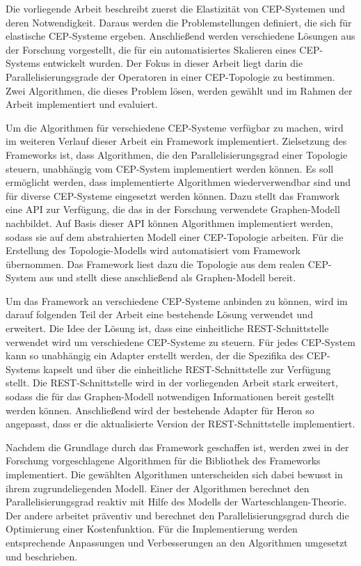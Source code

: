 Die vorliegende Arbeit beschreibt zuerst die Elastizität von CEP-Systemen und deren Notwendigkeit.
Daraus werden die Problemstellungen definiert, die sich für elastische CEP-Systeme ergeben.
Anschließend werden verschiedene Lösungen aus der Forschung vorgestellt, die für ein automatisiertes Skalieren eines CEP-Systems entwickelt wurden.
Der Fokus in dieser Arbeit liegt darin die Parallelisierungsgrade der Operatoren in einer CEP-Topologie zu bestimmen.
Zwei Algorithmen, die dieses Problem lösen, werden gewählt und im Rahmen der Arbeit implementiert und evaluiert.

Um die Algorithmen für verschiedene CEP-Systeme verfügbar zu machen, wird im weiteren Verlauf dieser Arbeit ein Framework implementiert.
Zielsetzung des Frameworks ist, dass Algorithmen, die den Parallelisierungsgrad einer Topologie steuern, unabhängig vom CEP-System implementiert werden können.
Es soll ermöglicht werden, dass implementierte Algorithmen wiederverwendbar sind und für diverse CEP-Systeme eingesetzt werden können.
Dazu stellt das Framwork eine API zur Verfügung, die das in der Forschung verwendete Graphen-Modell nachbildet.
Auf Basis dieser API können Algorithmen implementiert werden, sodass sie auf dem abstrahierten Modell einer CEP-Topologie arbeiten.
Für die Erstellung des Topologie-Modells wird automatisiert vom Framework übernommen.
Das Framework liest dazu die Topologie aus dem realen CEP-System aus und stellt diese anschließend als Graphen-Modell bereit. 

Um das Framework an verschiedene CEP-Systeme anbinden zu können, wird im darauf folgenden Teil der Arbeit eine bestehende Lösung \cite{goggel_vergleich_2018} verwendet und erweitert.
Die Idee der Lösung ist, dass eine einheitliche REST-Schnittstelle verwendet wird um verschiedene CEP-Systeme zu steuern.
Für jedes CEP-System kann so unabhängig ein Adapter erstellt werden, der die Spezifika des CEP-Systems kapselt und über die einheitliche REST-Schnittstelle zur Verfügung stellt.
Die REST-Schnittstelle wird in der vorliegenden Arbeit stark erweitert, sodass die für das Graphen-Modell notwendigen Informationen bereit gestellt werden können.
Anschließend wird der bestehende Adapter für Heron so angepasst, dass er die aktualisierte Version der REST-Schnittstelle implementiert.

Nachdem die Grundlage durch das Framework geschaffen ist, werden zwei in der Forschung vorgeschlagene Algorithmen für die Bibliothek des Frameworks implementiert.
Die gewählten Algorithmen unterscheiden sich dabei bewusst in ihrem zugrundeliegenden Modell.
Einer der Algorithmen berechnet den Parallelisierungsgrad reaktiv mit Hilfe des Modells der Warteschlangen-Theorie.
Der andere arbeitet präventiv und berechnet den Parallelisierungsgrad durch die Optimierung einer Kostenfunktion.
Für die Implementierung werden entsprechende Anpassungen und Verbesserungen an den Algorithmen umgesetzt und beschrieben.

